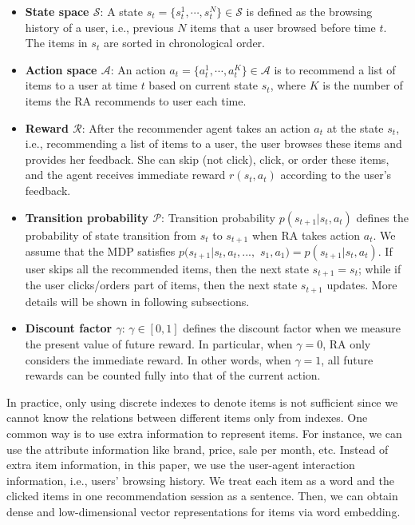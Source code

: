 \begin{itemize}[leftmargin=*]
	\item {\bf State space $\mathcal{S}$}: A state $s_t = \{s_t^{1}, \cdots, s_t^{N}\} \in \mathcal{S}$ is defined as the browsing history of a user, i.e., previous $N$ items that a user browsed before time $t$. The items in $s_t$ are sorted in chronological order.  
	\item {\bf Action space $\mathcal{A}$}:  An action $a_t = \{a_t^1,  \cdots, a_t^K\}\in \mathcal{A}$ is to recommend a list of items to a user at time $t$ based on current state $s_t$, where $K$ is the number of items the RA recommends to user each time. 
	\item {\bf Reward $\mathcal{R}$}: After the recommender agent takes an action $a_t$ at the state $s_t$, i.e., recommending a list of items to a user, the user browses these items and provides her feedback. She can skip (not click), click, or order these items, and the agent receives immediate reward $r(s_t,a_t)$ according to the user's feedback.
	\item {\bf Transition probability $\mathcal{P}$}: Transition probability $p(s_{t+1}|s_t,a_t)$ defines the probability of state transition from $s_t$ to $s_{t+1}$ when RA takes action $a_t$. We assume that the MDP satisfies $p(s_{t+1}|s_t,a_t,...,$ $s_1,a_1) = p(s_{t+1}|s_t,a_t)$. If user skips all the recommended items, then the next state $s_{t+1} = s_{t}$; while if the user clicks/orders part of items, then the next state $s_{t+1}$ updates.  More details will be shown in following subsections.
	\item {\bf Discount factor $\gamma$}: $\gamma \in [0,1]$ defines the discount factor when we measure the present value of future reward. In particular, when $\gamma = 0$, RA only considers the immediate reward. In other words, when $\gamma = 1$, all future rewards can be counted fully into that of the current action.
\end{itemize}

In practice, only using discrete indexes to denote items is not sufficient since we cannot know the relations between different items only from indexes. One common way is to use extra information to represent items. For instance, we can use the attribute information like brand, price, sale per month, etc. Instead of extra item information, in this paper, we use the user-agent interaction information, i.e., users' browsing history. We treat each item as a word and the clicked items in one recommendation session as a sentence. Then, we can obtain dense and low-dimensional vector representations for items via word embedding\cite{levy2014neural}.

